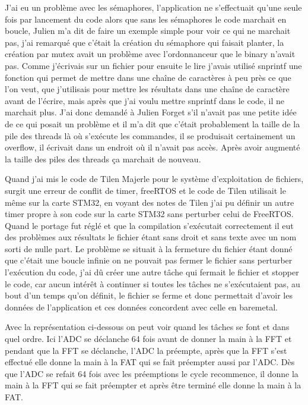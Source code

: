 \documentclass[a4paper]{article}
\begin{document}
J'ai eu un problème avec les sémaphores, l'application ne s'effectuait qu'une seule fois par lancement du code alors que sans les sémaphores le code marchait en boucle, Julien m'a dit de faire un exemple simple pour voir ce qui ne marchait pas, j'ai remarqué que c'était la création du sémaphore qui faisait planter, la création par mutex avait un problème avec l'ordonnanceur que le binary n'avait pas. Comme j'écrivais sur un fichier pour ensuite le lire j'avais utilisé snprintf une fonction qui permet de mettre dans une chaîne de caractères à peu près ce que l'on veut, que j'utilisais pour mettre les résultats dans une chaîne de caractère avant de l'écrire, mais après que j'ai voulu mettre snprintf dans le code, il ne marchait plus. J'ai donc demandé à Julien Forget s'il n'avait pas une petite idée de ce qui posait un problème et il m'a dit que c'était probablement la taille de la pile des threads là où s'exécute les commandes, il se produisait certainement un overflow, il écrivait dans un endroit où il n'avait pas accès. Après avoir augmenté la taille des piles des threads ça marchait de nouveau.

Quand j'ai mis le code de Tilen Majerle pour le système d'exploitation de fichiers, surgit une erreur de conflit de timer, freeRTOS et le code de Tilen utilisait le même sur la carte STM32, en voyant des notes de Tilen j'ai pu définir un autre timer propre à son code sur la carte STM32 sans perturber celui de FreeRTOS. Quand le portage fut réglé et que la compilation s'exécutait correctement il eut des problèmes aux résultats le fichier étant sans droit et sans texte avec un nom sorti de nulle part. Le problème se situait à la fermeture du fichier étant donné que c'était une boucle infinie on ne pouvait pas fermer le fichier sans perturber l'exécution du code, j'ai dû créer une autre tâche qui fermait le fichier et stopper le code, car aucun intérêt à continuer si toutes les tâches ne s'exécutaient pas, au bout d'un temps qu'on définit, le fichier se ferme et donc permettait d'avoir les données de l'application et ces données concordent avec celle en baremetal.

Avec la représentation ci-dessous on peut voir quand les tâches se font et dans quel ordre. Ici l'ADC se déclanche 64 fois avant de donner la main à la FFT et pendant que la FFT se déclanche, l'ADC la préempte, après que la FFT s'est effectué elle donne la main à la FAT qui se fait préempter aussi par l'ADC. Dès que l'ADC se refait 64 fois avec les préemptions le cycle recommence, il donne la main à la FFT qui se fait préempter et après être terminé elle donne la main à la FAT. 
\end{document}
